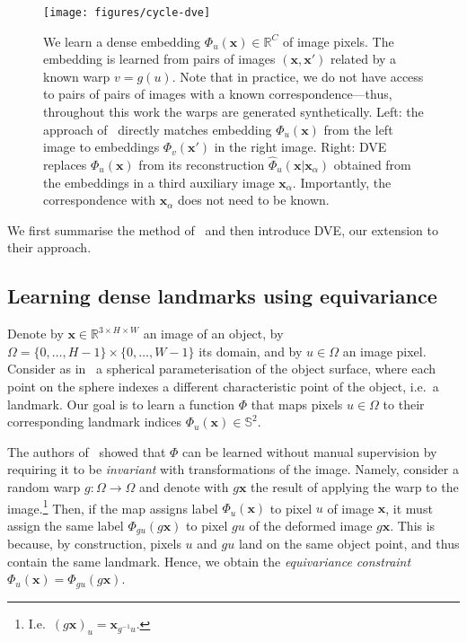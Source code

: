 \documentclass[10pt,twocolumn,letterpaper]{article}
\newcommand{\bx}{\mathbf{x}}
\begin{document}
\begin{figure*}[t]
\vspace*{-0.7cm}\hspace*{0.4cm}\centering\texttt{[image: figures/cycle-dve]}
\caption{We learn a dense embedding $\Phi_u(\bx)\in\mathbb{R}^C$ of image pixels.
The embedding is learned from pairs of images $(\bx,\bx')$ related by a known warp $v=g(u)$. Note that in practice, we do not have access to pairs of pairs of images with a known correspondence---thus, throughout this work the warps are generated synthetically.
Left: the approach of~\cite{thewlis17Bunsupervised} directly matches embedding $\Phi_u(\bx)$ from the left image to embeddings $\Phi_v(\bx')$ in the right image.
Right: DVE replaces $\Phi_u(\bx)$ from its reconstruction $\hat \Phi_u(\bx|\bx_\alpha)$ obtained from the embeddings in a third auxiliary image $\bx_\alpha$.
Importantly, the correspondence with $\bx_\alpha$ does not need to be known. 
}\label{f:transv}
\end{figure*} 
We first summarise the method of~\cite{thewlis17Bunsupervised} and then introduce DVE, our extension to their approach.

\subsection{Learning dense landmarks using equivariance}\label{s:die}

Denote by $\bx\in\mathbb{R}^{3\times H\times W}$ an image of an object, by $\Omega=\{0,\dots,H-1\}\times\{0,\dots,W-1\}$ its domain, and by $u\in \Omega$ an image pixel.
Consider as in~\cite{thewlis17Bunsupervised} a spherical parameterisation of the object surface, where each point on the sphere indexes a different characteristic point of the object, i.e.~a landmark.
Our goal is to learn a function $\Phi$ that maps pixels $u \in \Omega$ to their corresponding landmark indices $\Phi_u(\bx) \in \mathbb{S}^2$.

The authors of~\cite{thewlis17Bunsupervised} showed that $\Phi$ can be learned without manual supervision by requiring it to be \emph{invariant} with transformations of the image.
Namely, consider a random warp $g : \Omega \rightarrow \Omega$ and denote with $g\bx$ the result of applying the warp to the image.\footnote{I.e.~$(g\bx)_u = \bx_{g^{-1}u}$.}
Then, if the map assigns label $\Phi_{u}(\bx)$ to pixel $u$ of image $\bx$, it must assign the same label $\Phi_{gu}(g\bx)$ to pixel $gu$ of the deformed image $g\bx$.
This is because, by construction, pixels $u$ and $gu$ land on the same object point, and thus contain the same landmark.
Hence, we obtain the \emph{equivariance constraint} $\Phi_{u}(\bx)=\Phi_{gu}(g\bx)$.
\end{document}
